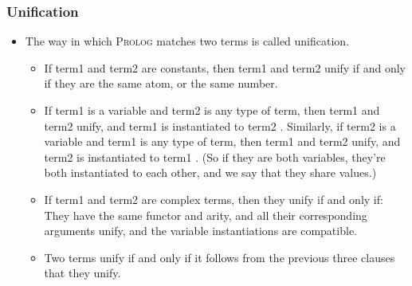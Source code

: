 \documentclass[hideothersubsections, t, aspectratio=1610]{beamer}
\newcommand{\progLang}[1]{\textsc{#1}}
\begin{document}
\begin{frame}
\frametitle{Unification}
\begin{itemize}
\item The way in which \progLang{Prolog} matches two terms is called unification. 
\begin{itemize}
\item If term1 and term2 are constants, then term1 and term2 unify if and only if they are the same atom, or the same number.

\item If term1 is a variable and term2 is any type of term, then term1 and term2 unify, and term1 is instantiated to term2 . Similarly, if term2 is a variable and term1 is any type of term, then term1 and term2 unify, and term2 is instantiated to term1 . (So if they are both variables, they’re both instantiated to each other, and we say that they share values.)

\item If term1 and term2 are complex terms, then they unify if and only if:
They have the same functor and arity, and
all their corresponding arguments unify, and
the variable instantiations are compatible.

\item Two terms unify if and only if it follows from the previous three clauses that they unify.
\end{itemize}

\end{itemize}
\end{frame}


\end{document}
